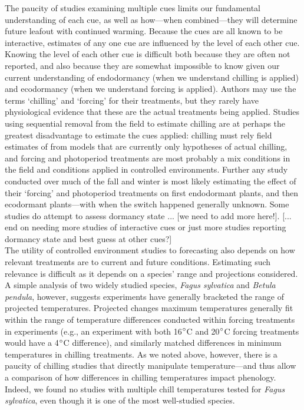 \documentclass[11pt,letter]{article}
\begin{document}
The paucity of studies examining multiple cues limits our fundamental understanding of each cue, as well as how---when combined---they will determine future leafout with continued warming. Because the cues are all known to be interactive, estimates of any one cue are influenced by the level of each other cue. Knowing the level of each other cue is difficult both because they are often not reported, and also because they are somewhat impossible to know given our current understanding of endodormancy (when we understand chilling is applied) and ecodormancy (when we understand forcing is applied). Authors may use the terms `chilling' and `forcing' for their treatments, but they rarely have physiological evidence that these are the actual treatments being applied. Studies using sequential removal from the field to estimate chilling are at perhaps the greatest disadvantage to estimate the cues applied: chilling must rely field estimates of from models that are currently only hypotheses of actual chilling, and forcing and photoperiod treatments are most probably a mix conditions in the field and conditions applied in controlled environments. Further any study conducted over much of the fall and winter is most likely estimating the effect of their `forcing' and photoperiod treatments on first endodormant plants, and then ecodormant plants---with when the switch happened generally unknown. Some studies do attempt to assess dormancy state ... [we need to add more here!]. [... end on needing more studies of interactive cues or just more studies reporting dormancy state and best guess at other cues?]\\

The utility of controlled environment studies to forecasting also depends on how relevant treatments are to current and future conditions. Estimating such relevance is difficult as it depends on a species' range and projections considered. A simple analysis of two widely studied species, \emph{Fagus sylvatica} and \emph{Betula pendula}, however, suggests experiments have generally bracketed the range of projected temperatures. Projected changes maximum temperatures generally fit within the range of temperature differences conducted within forcing treatments in experiments (e.g., an experiment with both 16$\degree$C  and 20$\degree$C forcing treatments would have a 4$\degree$C difference), and similarly matched differences in minimum temperatures in chilling treatments. As we noted above, however, there is a paucity of chilling studies that directly manipulate temperature---and thus allow a comparison of how differences in chilling temperatures impact phenology. Indeed, we found no studies with multiple chill temperatures tested for \emph{Fagus sylvatica}, even though it is one of the most well-studied species. \\
\end{document}
